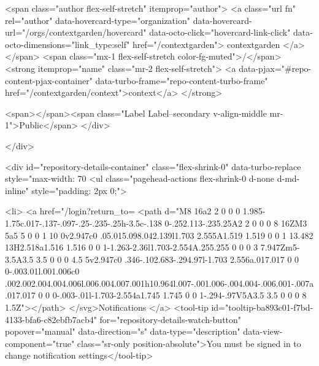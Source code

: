     <span class="author flex-self-stretch" itemprop="author">
      <a class="url fn" rel="author" data-hovercard-type="organization" data-hovercard-url="/orgs/contextgarden/hovercard" data-octo-click="hovercard-link-click" data-octo-dimensions="link_type:self" href="/contextgarden">
        contextgarden
</a>    </span>
    <span class="mx-1 flex-self-stretch color-fg-muted">/</span>
    <strong itemprop="name" class="mr-2 flex-self-stretch">
      <a data-pjax="#repo-content-pjax-container" data-turbo-frame="repo-content-turbo-frame" href="/contextgarden/context">context</a>
    </strong>

    <span></span><span class="Label Label--secondary v-align-middle mr-1">Public</span>
  </div>


        </div>

        <div id="repository-details-container" class="flex-shrink-0" data-turbo-replace style="max-width: 70%
            <ul class="pagehead-actions flex-shrink-0 d-none d-md-inline" style="padding: 2px 0;">
    
      

  <li>
            <a href="/login?return_to=%
    <path d="M8 16a2 2 0 0 0 1.985-1.75c.017-.137-.097-.25-.235-.25h-3.5c-.138 0-.252.113-.235.25A2 2 0 0 0 8 16ZM3 5a5 5 0 0 1 10 0v2.947c0 .05.015.098.042.139l1.703 2.555A1.519 1.519 0 0 1 13.482 13H2.518a1.516 1.516 0 0 1-1.263-2.36l1.703-2.554A.255.255 0 0 0 3 7.947Zm5-3.5A3.5 3.5 0 0 0 4.5 5v2.947c0 .346-.102.683-.294.97l-1.703 2.556a.017.017 0 0 0-.003.01l.001.006c0 .002.002.004.004.006l.006.004.007.001h10.964l.007-.001.006-.004.004-.006.001-.007a.017.017 0 0 0-.003-.01l-1.703-2.554a1.745 1.745 0 0 1-.294-.97V5A3.5 3.5 0 0 0 8 1.5Z"></path>
</svg>Notifications
</a>    <tool-tip id="tooltip-ba893c01-f7bd-4133-bfa6-c82ebfb7acb4" for="repository-details-watch-button" popover="manual" data-direction="s" data-type="description" data-view-component="true" class="sr-only position-absolute">You must be signed in to change notification settings</tool-tip>

